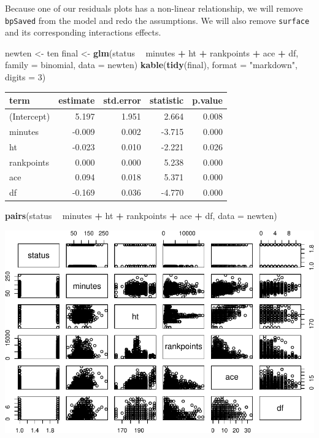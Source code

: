 \documentclass[]{article}
\newenvironment{Shaded}{\begin{snugshade}}{\end{snugshade}}
\newcommand{\DataTypeTok}[1]{\textcolor[rgb]{0.13,0.29,0.53}{#1}}
\newcommand{\DecValTok}[1]{\textcolor[rgb]{0.00,0.00,0.81}{#1}}
\newcommand{\KeywordTok}[1]{\textcolor[rgb]{0.13,0.29,0.53}{\textbf{#1}}}
\newcommand{\NormalTok}[1]{#1}
\newcommand{\OperatorTok}[1]{\textcolor[rgb]{0.81,0.36,0.00}{\textbf{#1}}}
\newcommand{\StringTok}[1]{\textcolor[rgb]{0.31,0.60,0.02}{#1}}
\begin{document}
Because one of our residuals plots has a non-linear relationship, we
will remove \texttt{bpSaved} from the model and redo the assumptions. We
will also remove \texttt{surface} and its corresponding interactions
effects.

\begin{Shaded}
\begin{Highlighting}[]
\NormalTok{newten <-}\StringTok{ }\NormalTok{ten}
\NormalTok{final <-}\StringTok{ }\KeywordTok{glm}\NormalTok{(status }\OperatorTok{~}\StringTok{ }\NormalTok{minutes }\OperatorTok{+}\StringTok{ }\NormalTok{ht }\OperatorTok{+}\StringTok{ }\NormalTok{rankpoints }\OperatorTok{+}\StringTok{ }\NormalTok{ace }\OperatorTok{+}\StringTok{ }\NormalTok{df, }\DataTypeTok{family =}\NormalTok{ binomial, }\DataTypeTok{data =}\NormalTok{ newten)}
\KeywordTok{kable}\NormalTok{(}\KeywordTok{tidy}\NormalTok{(final), }\DataTypeTok{format =} \StringTok{"markdown"}\NormalTok{, }\DataTypeTok{digits =} \DecValTok{3}\NormalTok{)}
\end{Highlighting}
\end{Shaded}

\begin{longtable}[]{@{}lrrrr@{}}
\toprule
term & estimate & std.error & statistic & p.value\tabularnewline
\midrule
\endhead
(Intercept) & 5.197 & 1.951 & 2.664 & 0.008\tabularnewline
minutes & -0.009 & 0.002 & -3.715 & 0.000\tabularnewline
ht & -0.023 & 0.010 & -2.221 & 0.026\tabularnewline
rankpoints & 0.000 & 0.000 & 5.238 & 0.000\tabularnewline
ace & 0.094 & 0.018 & 5.371 & 0.000\tabularnewline
df & -0.169 & 0.036 & -4.770 & 0.000\tabularnewline
\bottomrule
\end{longtable}

\begin{Shaded}
\begin{Highlighting}[]
\KeywordTok{pairs}\NormalTok{(status }\OperatorTok{~}\StringTok{ }\NormalTok{minutes }\OperatorTok{+}\StringTok{ }\NormalTok{ht }\OperatorTok{+}\StringTok{ }\NormalTok{rankpoints }\OperatorTok{+}\StringTok{ }\NormalTok{ace }\OperatorTok{+}\StringTok{ }\NormalTok{df, }\DataTypeTok{data =}\NormalTok{ newten)}
\end{Highlighting}
\end{Shaded}

\includegraphics{Project_files/figure-latex/unnamed-chunk-21-1.pdf}
\end{document}
